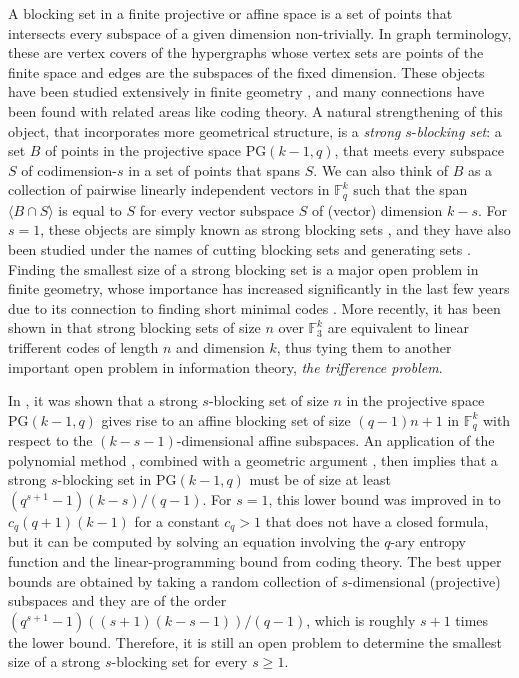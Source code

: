 \documentclass[11pt]{article}
\theoremstyle{plain}
\theoremstyle{definition}
\begin{document}
A blocking set in a finite projective or affine space is a set of points that intersects every subspace of a given dimension non-trivially. 
In graph terminology, these are vertex covers of the hypergraphs whose vertex sets are points of the finite space and edges are the subspaces of the fixed dimension. 
These objects have been studied extensively in finite geometry \cite{blokhuis2011blocking, brouwer1978blocking}, and many connections have been found with related areas like coding theory. 
A natural strengthening of this object, that incorporates more geometrical structure, is a \textit{strong} $s$-\textit{blocking set}: a set $B$ of points in the projective space $\mathrm{PG}(k - 1, q)$, that meets every subspace $S$ of codimension-$s$ in a set of points that spans $S$. 
We can also think of $B$ as a collection of pairwise linearly independent vectors %
in $\mathbb{F}_q^k$ such that the span $\langle B \cap S \rangle$ is equal to $S$ for every vector subspace $S$ of (vector) dimension $k - s$. 
For $s = 1$, these objects are simply known as strong blocking sets \cite{davydov2011linear, heger2021short}, and they have also been studied under the names of cutting blocking sets \cite{alfarano2022geometric, bonini2021minimal} and generating sets \cite{fancsali2014lines, fancsali2016higgledy}. 
Finding the smallest size of a strong blocking set is a major open problem in finite geometry, whose importance has increased significantly in the last few years due to its connection to finding short minimal codes \cite{alfarano2022geometric, tang2021full}. 
More recently, it has been shown in \cite{bishnoi2024blocking} that strong blocking sets of size $n$ over $\mathbb{F}_3^k$ are equivalent to linear trifferent codes of length $n$ and dimension $k$, thus tying them to another important open problem in information theory, \textit{the trifference problem}. 

In \cite[Lemma 1.2]{bishnoi2024blocking}, it was shown that a strong $s$-blocking set of size $n$ in the projective space $\mathrm{PG}(k -1, q)$ gives rise to an affine blocking set of size $(q - 1)n + 1$ in $\mathbb{F}_q^k$ with respect to the $(k - s - 1)$-dimensional affine subspaces. 
An application of the polynomial method \cite{brouwer1978blocking}, combined with a geometric argument \cite[Section 3]{ball2011polynomial}, then implies that a strong $s$-blocking set in $\mathrm{PG}(k-1, q)$ must be of size 
at least $(q^{s+1} - 1)(k - s)/(q - 1)$. 
For $s = 1$, this lower bound was improved in \cite[Theorem 1.4]{bishnoi2024blocking} to $c_q (q + 1) ( k - 1)$ for a constant $c_q > 1$ that does not have a closed formula, but it can be computed by solving an equation involving the $q$-ary entropy function and the linear-programming bound from coding theory. 
The best upper bounds are obtained by taking a random collection of $s$-dimensional (projective) subspaces \cite[Remark 3.4]{bishnoi2024blocking} and they are of the order $(q^{s + 1} - 1)((s + 1)(k - s - 1))/(q - 1)$, which is roughly $s + 1$ times the lower bound. 
Therefore, it is still an open problem to determine the smallest size of a strong $s$-blocking set for every $s \geq 1$.
\end{document}
